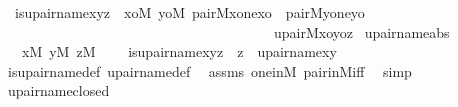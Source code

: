 \begin{isabellebody}
\ \ {\isachardoublequoteopen}is{\isacharunderscore}{\kern0pt}upair{\isacharunderscore}{\kern0pt}name{\isacharparenleft}{\kern0pt}x{\isacharcomma}{\kern0pt}y{\isacharcomma}{\kern0pt}z{\isacharparenright}{\kern0pt}\ {\isasymequiv}\ {\isasymexists}xo{\isasymin}M{\isachardot}{\kern0pt}\ {\isasymexists}yo{\isasymin}M{\isachardot}{\kern0pt}\ pair{\isacharparenleft}{\kern0pt}{\isacharhash}{\kern0pt}{\isacharhash}{\kern0pt}M{\isacharcomma}{\kern0pt}x{\isacharcomma}{\kern0pt}one{\isacharcomma}{\kern0pt}xo{\isacharparenright}{\kern0pt}\ {\isasymand}\ pair{\isacharparenleft}{\kern0pt}{\isacharhash}{\kern0pt}{\isacharhash}{\kern0pt}M{\isacharcomma}{\kern0pt}y{\isacharcomma}{\kern0pt}one{\isacharcomma}{\kern0pt}yo{\isacharparenright}{\kern0pt}\ {\isasymand}\ \isanewline
\ \ \ \ \ \ \ \ \ \ \ \ \ \ \ \ \ \ \ \ \ \ \ \ \ \ \ \ \ \ \ \ \ \ \ \ \ \ \ upair{\isacharparenleft}{\kern0pt}{\isacharhash}{\kern0pt}{\isacharhash}{\kern0pt}M{\isacharcomma}{\kern0pt}xo{\isacharcomma}{\kern0pt}yo{\isacharcomma}{\kern0pt}z{\isacharparenright}{\kern0pt}{\isachardoublequoteclose}\isanewline
\isanewline
{}\isamarkupfalse%
\ upair{\isacharunderscore}{\kern0pt}name{\isacharunderscore}{\kern0pt}abs\ {\isacharcolon}{\kern0pt}\ \isanewline
\ \ \ {\isachardoublequoteopen}x{\isasymin}M{\isachardoublequoteclose}\ {\isachardoublequoteopen}y{\isasymin}M{\isachardoublequoteclose}\ {\isachardoublequoteopen}z{\isasymin}M{\isachardoublequoteclose}\ \isanewline
\ \ \ {\isachardoublequoteopen}is{\isacharunderscore}{\kern0pt}upair{\isacharunderscore}{\kern0pt}name{\isacharparenleft}{\kern0pt}x{\isacharcomma}{\kern0pt}y{\isacharcomma}{\kern0pt}z{\isacharparenright}{\kern0pt}\ {\isasymlongleftrightarrow}\ z\ {\isacharequal}{\kern0pt}\ upair{\isacharunderscore}{\kern0pt}name{\isacharparenleft}{\kern0pt}x{\isacharcomma}{\kern0pt}y{\isacharparenright}{\kern0pt}{\isachardoublequoteclose}\ \isanewline
%
\isadelimproof
\ \ %
\endisadelimproof
%
\isatagproof
{}\isamarkupfalse%
\ is{\isacharunderscore}{\kern0pt}upair{\isacharunderscore}{\kern0pt}name{\isacharunderscore}{\kern0pt}def\ upair{\isacharunderscore}{\kern0pt}name{\isacharunderscore}{\kern0pt}def\ \isamarkupfalse%
\ assms\ one{\isacharunderscore}{\kern0pt}in{\isacharunderscore}{\kern0pt}M\ pair{\isacharunderscore}{\kern0pt}in{\isacharunderscore}{\kern0pt}M{\isacharunderscore}{\kern0pt}iff\ \isamarkupfalse%
\ simp%
\endisatagproof
{\isafoldproof}%
%
\isadelimproof
\isanewline
%
\endisadelimproof
\isanewline
{}\isamarkupfalse%
\ upair{\isacharunderscore}{\kern0pt}name{\isacharunderscore}{\kern0pt}closed\ {\isacharcolon}{\kern0pt}\isanewline

\end{isabellebody}
